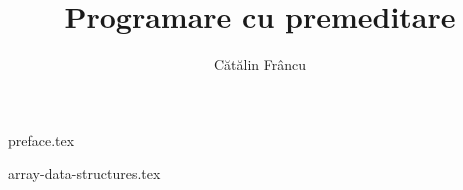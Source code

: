 \documentclass[12pt,openany]{book}
\title{Programare cu premeditare}
\author{Cătălin Frâncu}
\date{}
\begin{document}

\hypersetup{pageanchor=false}

\begin{titlepage}
\maketitle
\end{titlepage}

\hypersetup{pageanchor=true}
\cleardoublepage

\mainmatter

{preface.tex}

\raggedbottom

\begingroup
\hypersetup{hidelinks} %
\tableofcontents
\endgroup

\cleardoublepage

{array-data-structures.tex}
\end{document}
